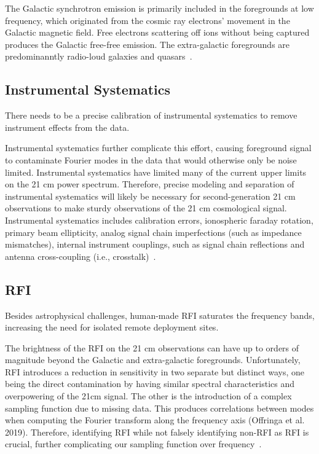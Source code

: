 \documentclass[12pt,a4paper]{report}
\begin{document}
	The Galactic synchrotron emission is primarily included in the foregrounds at low frequency, which originated from the cosmic ray electrons' movement in the Galactic magnetic field. Free electrons scattering off ions without being captured produces the Galactic free-free emission. The extra-galactic foregrounds are predominanntly radio-loud galaxies and quasars~\citep{2018RAA....18..114H, 2008MNRAS.389.1319J}.

	\subsection*{Instrumental Systematics}
	
	There needs to be a precise calibration of instrumental systematics to remove instrument effects from the data.
		
	Instrumental systematics further complicate this effort, causing foreground signal to contaminate Fourier modes in the data that would otherwise only be noise limited. Instrumental systematics have limited many of the current upper limits on the 21 cm power spectrum. Therefore, precise modeling and separation of instrumental systematics will likely be necessary for second-generation 21 cm observations to make sturdy observations of the 21 cm cosmological signal. Instrumental systematics includes calibration errors, ionospheric faraday rotation, primary beam ellipticity, analog signal chain imperfections (such as impedance mismatches), internal instrument couplings, such as signal chain reflections and antenna cross-coupling (i.e., crosstalk)~\citep{2020ApJ...888...70K}.
	
	
	
	\subsection*{RFI}
	
	Besides astrophysical challenges, human-made RFI saturates the frequency bands, increasing the need for isolated remote deployment sites. 
	
	The brightness of the RFI on the 21 cm observations can have up to orders of magnitude beyond the Galactic and extra-galactic foregrounds. Unfortunately, RFI introduces a reduction in sensitivity in two separate but distinct ways, one being the direct contamination by having similar spectral characteristics and overpowering of the 21cm signal. The other is the introduction of a complex sampling function due to missing data. This produces correlations between modes when computing the Fourier transform along the frequency axis (Offringa et al. 2019). Therefore,  identifying RFI while not falsely identifying non-RFI as RFI is crucial, further complicating our sampling function over frequency~\citep{2019MNRAS.488.2605K}.
		
\end{document}
